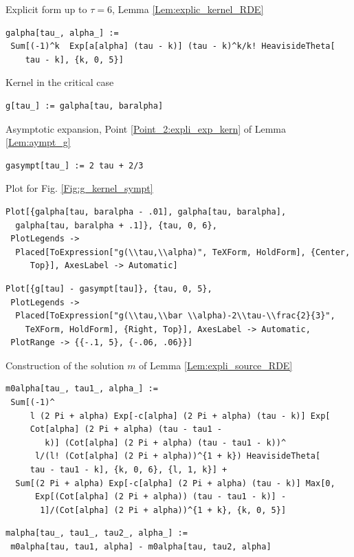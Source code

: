 \documentclass[reqno]{amsart}
\theoremstyle{definition} \newtheorem{definition}{Definition}[section]
\theoremstyle{definition} \newtheorem{remark}[definition]{Remark}
\theoremstyle{plain} \newtheorem{lemma}[definition]{Lemma}
\theoremstyle{plain} \newtheorem{proposition}[definition]{Proposition}
\theoremstyle{plain} \newtheorem{theorem}[definition]{Theorem}
\theoremstyle{plain} \newtheorem{corollary}[definition]{Corollary}
\theoremstyle{definition} \newtheorem{example}[definition]{Example}
\theoremstyle{plain} \newtheorem{claim}[clai]{Claim}
\theoremstyle{definition} \newtheorem{assumption}[definition]{Assumption}
\theoremstyle{definition} \newtheorem{observation}[definition]{Observation}
\newcommand{\1}{\mathbbm 1}
\numberwithin{equation}{section} %
\theoremstyle{plain} \newtheorem*{theorem*}{Theorem}
\theoremstyle{plain} \newtheorem{mthm}[maintheorem]{Main Theorem}
\theoremstyle{plain} \newtheorem*{mthm*}{Main Theorem}
\theoremstyle{plain} \newtheorem*{conjecture*}{Conjecture}
\theoremstyle{plain} \newtheorem{conjecture}[definition]{Conjecture}
\theoremstyle{plain} \newtheorem*{problem*}{Problem}
\begin{document}
\noindent Explicit form up to $\tau = 6$, Lemma \ref{Lem:explic_kernel_RDE}
\medskip
\begin{verbatim}
galpha[tau_, alpha_] := 
 Sum[(-1)^k  Exp[a[alpha] (tau - k)] (tau - k)^k/k! HeavisideTheta[
    tau - k], {k, 0, 5}]
\end{verbatim}
\medskip
Kernel in the critical case
\medskip
\begin{verbatim}
g[tau_] := galpha[tau, baralpha]
\end{verbatim}
\medskip
Asymptotic expansion, Point \ref{Point_2:expli_exp_kern} of Lemma \ref{Lem:aympt_g}
\medskip
\begin{verbatim}
gasympt[tau_] := 2 tau + 2/3
\end{verbatim}
\medskip
Plot for Fig. \ref{Fig:g_kernel_sympt}
\medskip
\begin{verbatim}
Plot[{galpha[tau, baralpha - .01], galpha[tau, baralpha], 
  galpha[tau, baralpha + .1]}, {tau, 0, 6}, 
 PlotLegends -> 
  Placed[ToExpression["g(\\tau,\\alpha)", TeXForm, HoldForm], {Center,
     Top}], AxesLabel -> Automatic]
\end{verbatim}
\begin{verbatim}
Plot[{g[tau] - gasympt[tau]}, {tau, 0, 5}, 
 PlotLegends -> 
  Placed[ToExpression["g(\\tau,\\bar \\alpha)-2\\tau-\\frac{2}{3}", 
    TeXForm, HoldForm], {Right, Top}], AxesLabel -> Automatic, 
 PlotRange -> {{-.1, 5}, {-.06, .06}}]
\end{verbatim}
\medskip
Construction of the solution $m$ of Lemma \ref{Lem:expli_source_RDE}
\medskip
\begin{verbatim}
m0alpha[tau_, tau1_, alpha_] := 
 Sum[(-1)^
     l (2 Pi + alpha) Exp[-c[alpha] (2 Pi + alpha) (tau - k)] Exp[
     Cot[alpha] (2 Pi + alpha) (tau - tau1 - 
        k)] (Cot[alpha] (2 Pi + alpha) (tau - tau1 - k))^
      l/(l! (Cot[alpha] (2 Pi + alpha))^{1 + k}) HeavisideTheta[
     tau - tau1 - k], {k, 0, 6}, {l, 1, k}] + 
  Sum[(2 Pi + alpha) Exp[-c[alpha] (2 Pi + alpha) (tau - k)] Max[0, 
      Exp[(Cot[alpha] (2 Pi + alpha)) (tau - tau1 - k)] - 
       1]/(Cot[alpha] (2 Pi + alpha))^{1 + k}, {k, 0, 5}]
\end{verbatim}
\begin{verbatim}
malpha[tau_, tau1_, tau2_, alpha_] := 
 m0alpha[tau, tau1, alpha] - m0alpha[tau, tau2, alpha]
\end{verbatim}
\end{document}
